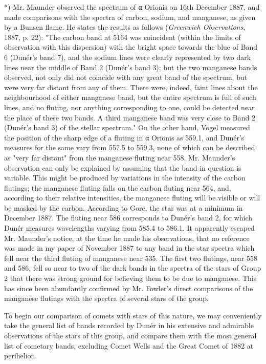 \documentclass[a4paper, 12pt, oneside, polutonikogreek, english]{article}
\begin{document}
*) Mr. Maunder observed the spectrum of α Orionis on 16th December 1887, and made comparisons with the spectra of carbon, sodium, and manganese, as given by a Bunsen flame. He states the results as follows (\emph{Greenwich Observations}, 1887, p. 22): "The carbon band at 5164 was coincident (within the limits of observation with this dispersion) with the bright space towards the blue of Band 6 (Dunér's band 7), and the sodium lines were clearly represented by two dark lines near the middle of Band 2 (Dunér's band 3); but the two manganese bands observed, not only did not coincide with any great band of the spectrum, but were very far distant from any of them. There were, indeed, faint lines about the neighbourhood of either manganese band, but the entire spectrum is full of such lines, and no fluting, nor anything corresponding to one, could be detected near the place of these two bands. A third manganese band was very close to Band 2 (Dunér's band 3) of the stellar spectrum." On the other hand, Vogel measured the position of the sharp edge of a fluting in α Orionis as 559.1, and Dunér's measures for the same vary from 557.5 to 559.3, none of which can be described as "very far distant" from the manganese fluting near 558. Mr. Maunder's observation can only be explained by assuming that the band in question is variable. This might be produced by variations in the intensity of the carbon flutings; the manganese fluting falls on the carbon fluting near 564, and, according to their relative intensities, the manganese fluting will be visible or will be masked by the carbon. According to Gore, the star was at a minimum in December 1887. The fluting near 586 corresponds to Dunér's band 2, for which Dunér measures wavelengths varying from 585.4 to 586.1. It apparently escaped Mr. Maunder's notice, at the time he made his observations, that no reference was made in my paper of November 1887 to any band in the star spectra which fell near the third fluting of manganese near 535. The first two flutings, near 558 and 586, fell so near to two of the dark bands in the spectra of the stars of Group 2 that there was strong ground for believing them to be due to manganese. This has since been abundantly confirmed by Mr. Fowler's direct comparisons of the manganese flutings with the spectra of several stars of the group.

To begin our comparison of comets with stars of this nature, we may conveniently take the general list of bands recorded by Dunér in his extensive and admirable observations of the stars of this group, and compare them with the most general list of cometary bands, excluding Comet Wells and the Great Comet of 1882 at perihelion.
\end{document}
